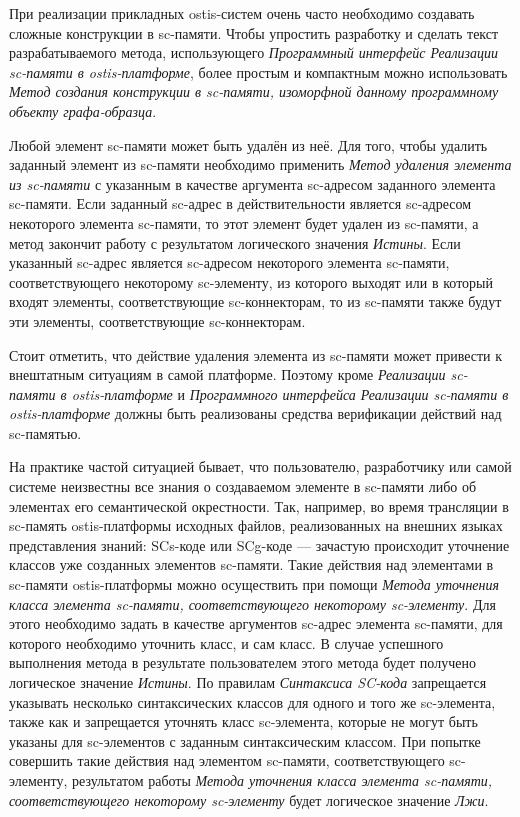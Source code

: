 При реализации прикладных ostis-систем очень часто необходимо создавать сложные конструкции в sc-памяти. Чтобы упростить разработку и сделать текст разрабатываемого метода, использующего \textit{Программный интерфейс Реализации sc-памяти в ostis-платформе}, более простым и компактным можно использовать \textit{Метод создания конструкции в sc-памяти, изоморфной данному программному объекту графа-образца}.

Любой элемент sc-памяти может быть удалён из неё. Для того, чтобы удалить заданный элемент из sc-памяти необходимо применить \textit{Метод удаления элемента из sc-памяти} с указанным в качестве аргумента sc-адресом заданного элемента sc-памяти. Если заданный sc-адрес в действительности является sc-адресом некоторого элемента sc-памяти, то этот элемент будет удален из sc-памяти, а метод закончит работу с результатом логического значения \textit{Истины}. Если указанный sc-адрес является sc-адресом некоторого элемента sc-памяти, соответствующего некоторому sc-элементу, из которого выходят или в который входят элементы, соответствующие sc-коннекторам, то из sc-памяти также будут эти элементы, соответствующие sc-коннекторам.

Стоит отметить, что действие удаления элемента из sc-памяти может привести к внештатным ситуациям в самой платформе. Поэтому кроме \textit{Реализации sc-памяти в ostis-платформе} и \textit{Программного интерфейса Реализации sc-памяти в ostis-платформе} должны быть реализованы средства верификации действий над sc-памятью.

На практике частой ситуацией бывает, что пользователю, разработчику или самой системе неизвестны все знания о создаваемом элементе в sc-памяти либо об элементах его семантической окрестности. Так, например, во время трансляции в sc-память ostis-платформы исходных файлов, реализованных на внешних языках представления знаний: SCs-коде или SCg-коде --- зачастую происходит уточнение классов уже созданных элементов sc-памяти. Такие действия над элементами в sc-памяти ostis-платформы можно осуществить при помощи \textit{Метода уточнения класса элемента sc-памяти, соответствующего некоторому sc-элементу}. Для этого необходимо задать в качестве аргументов sc-адрес элемента sc-памяти, для которого необходимо уточнить класс, и сам класс. В случае успешного выполнения метода в результате пользователем этого метода будет получено логическое значение \textit{Истины}. По правилам \textit{Синтаксиса SC-кода} запрещается указывать несколько синтаксических классов для одного и того же sc-элемента, также как и запрещается уточнять класс sc-элемента, которые не могут быть указаны для sc-элементов с заданным синтаксическим классом. При попытке совершить такие действия над элементом sc-памяти, соответствующего sc-элементу, результатом работы \textit{Метода уточнения класса элемента sc-памяти, соответствующего некоторому sc-элементу} будет логическое значение \textit{Лжи}. 

